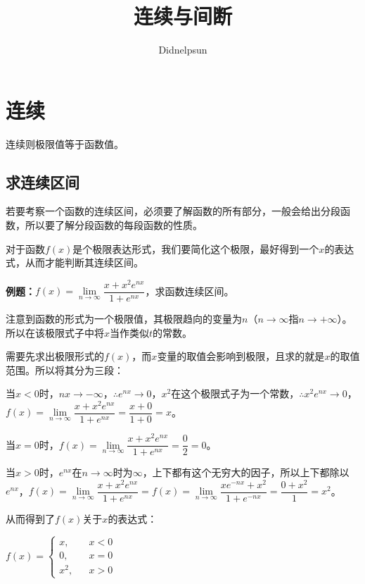 \documentclass[UTF8, 12pt]{ctexart}
\author{Didnelpsun}
\title{连续与间断}
\date{}
\begin{document}
\maketitle
\pagestyle{empty}
\thispagestyle{empty}
\tableofcontents
\thispagestyle{empty}
\newpage
\pagestyle{plain}
\setcounter{page}{1}
\section{连续}

连续则极限值等于函数值。

\subsection{求连续区间}

若要考察一个函数的连续区间，必须要了解函数的所有部分，一般会给出分段函数，所以要了解分段函数的每段函数的性质。

对于函数$f(x)$是个极限表达形式，我们要简化这个极限，最好得到一个$x$的表达式，从而才能判断其连续区间。\medskip

\textbf{例题：}$f(x)=\lim\limits_{n\to\infty}\dfrac{x+x^2e^{nx}}{1+e^{nx}}$，求函数连续区间。\medskip

注意到函数的形式为一个极限值，其极限趋向的变量为$n$（$n\to\infty$指$n\to+\infty$）。所以在该极限式子中将$x$当作类似$t$的常数。

需要先求出极限形式的$f(x)$，而$x$变量的取值会影响到极限，且求的就是$x$的取值范围。所以将其分为三段：

当$x<0$时，$nx\to-\infty$，$\therefore e^{nx}\to 0$，$x^2$在这个极限式子为一个常数，$\therefore x^2e^{nx}\to 0$，$f(x)=\lim\limits_{n\to\infty}\dfrac{x+x^2e^{nx}}{1+e^{nx}}=\dfrac{x+0}{1+0}=x$。\medskip

当$x=0$时，$f(x)=\lim\limits_{n\to\infty}\dfrac{x+x^2e^{nx}}{1+e^{nx}}=\dfrac{0}{2}=0$。\medskip

当$x>0$时，$e^{nx}$在$n\to\infty$时为$\infty$，上下都有这个无穷大的因子，所以上下都除以$e^{nx}$，$f(x)=\lim\limits_{n\to\infty}\dfrac{x+x^2e^{nx}}{1+e^{nx}}=f(x)=\lim\limits_{n\to\infty}\dfrac{xe^{-nx}+x^2}{1+e^{-nx}}=\dfrac{0+x^2}{1}=x^2$。\medskip

从而得到了$f(x)$关于$x$的表达式：\medskip

$f(x)=\left\{\begin{array}{lcl}
    x, & & x<0 \\
    0, & & x=0 \\
    x^2, & & x>0
\end{array}
\right.$\medskip
\end{document}

